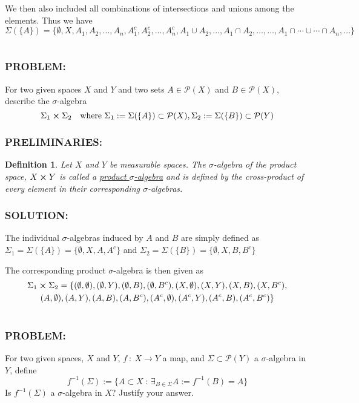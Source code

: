 \documentclass[]{article}
\newcommand{\Problem}{\subsubsection*{\textbf{PROBLEM:}}}
\newcommand{\Solution}{\subsubsection*{\textbf{SOLUTION:}}}
\newcommand{\Preliminaries}{\subsubsection*{\textbf{PRELIMINARIES:}}}
\newcommand{\st}{\ : \ }
\newtheorem{definition}{Definition}
\begin{document}
We then also included all combinations of intersections and unions among the elements. 
Thus we have \[
    \Sigma(\{A\}) = \{\emptyset, X, A_1,A_2,\dots,A_n, A_1^c,A_2^c,\dots,A_n^c, 
    A_1 \cup A_2, \dots, %
    A_1 \cap A_2, \dots, %
    \dots, A_1 \cap \cdots \cup \cdots \cap A_n, \dots\}
\]

\newpage
\section{}
\Problem
For two given spaces $X$ and $Y$ and two sets $A \in \mathcal{P}(X)$ and $B \in \mathcal{P}(X)$, describe the $\sigma$-algebra \[
    \Sigma_1 \cross \Sigma_2 \quad \text{where} \ 
    \Sigma_1 := \Sigma(\{A\}) \subset \mathcal{P}(X), 
    \Sigma_2 := \Sigma(\{B\}) \subset \mathcal{P}(Y)
\]

\Preliminaries
\begin{definition}
    Let $X$ and $Y$ be measurable spaces. 
    The $\sigma$-algebra of the product space, $X \cross Y$ is called a \emph{\underline{product $\sigma$-algebra}} and is defined by the cross-product of every element in their corresponding $\sigma$-algebras.
\end{definition}

\Solution
The individual $\sigma$-algebras induced by $A$ and $B$ are simply defined as 
$\Sigma_1 = \Sigma(\{A\}) = \{\emptyset, X, A, A^c\}$
and
$\Sigma_2 = \Sigma(\{B\}) = \{\emptyset, X, B, B^c\}$

The corresponding product $\sigma$-algebra is then given as \begin{multline*}
    \Sigma_1 \cross \Sigma_2 = 
    \{
        (\emptyset,\emptyset), (\emptyset, Y), (\emptyset, B), (\emptyset, B^c),
        (X,\emptyset), (X, Y), (X, B), (X, B^c),\\
        (A,\emptyset), (A, Y), (A, B), (A, B^c),
        (A^c,\emptyset), (A^c, Y), (A^c, B), (A^c, B^c)
    \}
\end{multline*}


\newpage
\section{}
\Problem
For two given spaces, $X$ and $Y$, $f \st X \to Y$ a map, and $\Sigma \subset \mathcal{P}(Y)$ a $\sigma$-algebra in $Y$, define \[
    f^{-1}(\Sigma) := \{A \subset X \st \exists_{B \in \Sigma} A := f^{-1}(B) = A\}
\]
Is $f^{-1}(\Sigma)$ a $\sigma$-algebra in $X$?
Justify your answer.
\end{document}
